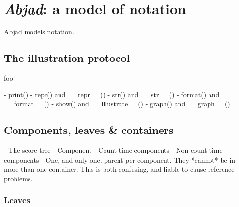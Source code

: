 \chapter{\emph{Abjad}: a model of notation}
\label{chap:a-model-of-notation}

\begin{comment}
<abjad>[hide=true]
import collections
import consort
</abjad>
\end{comment}

Abjad models notation.

\section{The illustration protocol}

foo

\begin{markdown}
-   print()
-   repr() and __repr__()
-   str() and __str__()
-   format() and __format__()
-   show() and __illustrate__()
-   graph() and __graph__()
\end{markdown}

\section{Components, leaves \& containers}

\begin{markdown}
-   The score tree
-   Component
-   Count-time components
-   Non-count-time components
-   One, and only one, parent per component. They *cannot* be in more than one
    container. This is both confusing, and liable to cause reference problems.
\end{markdown}

\subsection{Leaves}

